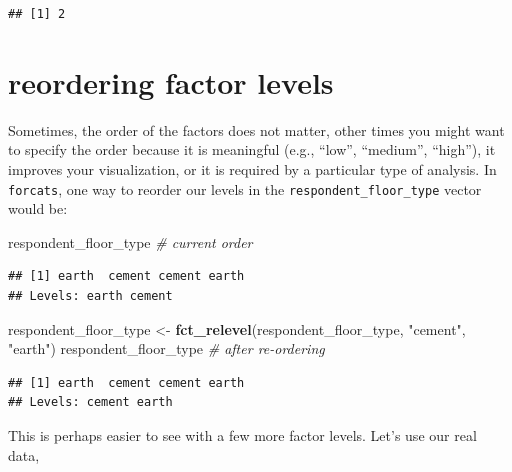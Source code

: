 \documentclass[]{book}
\newenvironment{Shaded}{\begin{snugshade}}{\end{snugshade}}
\newcommand{\KeywordTok}[1]{\textcolor[rgb]{0.13,0.29,0.53}{\textbf{#1}}}
\newcommand{\StringTok}[1]{\textcolor[rgb]{0.31,0.60,0.02}{#1}}
\newcommand{\CommentTok}[1]{\textcolor[rgb]{0.56,0.35,0.01}{\textit{#1}}}
\newcommand{\OperatorTok}[1]{\textcolor[rgb]{0.81,0.36,0.00}{\textbf{#1}}}
\newcommand{\NormalTok}[1]{#1}
\begin{document}
\begin{verbatim}
## [1] 2
\end{verbatim}

\section{reordering factor levels}\label{reordering-factor-levels}

Sometimes, the order of the factors does not matter, other times you
might want to specify the order because it is meaningful (e.g., ``low'',
``medium'', ``high''), it improves your visualization, or it is required
by a particular type of analysis. In \texttt{forcats}, one way to
reorder our levels in the \texttt{respondent\_floor\_type} vector would
be:

\begin{Shaded}
\begin{Highlighting}[]
\NormalTok{respondent_floor_type }\CommentTok{# current order}
\end{Highlighting}
\end{Shaded}

\begin{verbatim}
## [1] earth  cement cement earth 
## Levels: earth cement
\end{verbatim}

\begin{Shaded}
\begin{Highlighting}[]
\NormalTok{respondent_floor_type <-}\StringTok{ }\KeywordTok{fct_relevel}\NormalTok{(respondent_floor_type, }\StringTok{"cement"}\NormalTok{, }\StringTok{"earth"}\NormalTok{)}
\NormalTok{respondent_floor_type }\CommentTok{# after re-ordering}
\end{Highlighting}
\end{Shaded}

\begin{verbatim}
## [1] earth  cement cement earth 
## Levels: cement earth
\end{verbatim}

This is perhaps easier to see with a few more factor levels. Let's use
our real data,

\begin{Shaded}
\end{Shaded}
\end{document}
